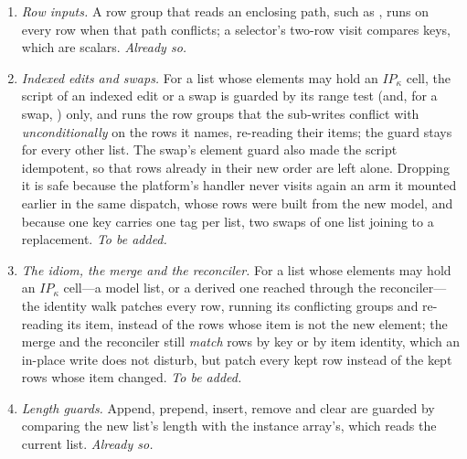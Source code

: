 \begin{enumerate}[label=(\alph*)]
skipping its body. A keyed 's key is of a key type, a scalar. \emph{Already so.}
\item \emph{Row inputs.} A row group that reads an enclosing path, such as , runs on
every row when that path conflicts; a selector's two-row visit compares keys, which are scalars.
\emph{Already so.}
\item \emph{Indexed edits and swaps.} For a list whose elements may hold an $\mathit{IP}_\kappa$ cell, the
script of an indexed edit or a swap is guarded by its range test (and, for a swap, )
only, and runs the row groups that the sub-writes conflict with \emph{unconditionally} on the rows it
names, re-reading their items; the guard  stays for every other list.
The swap's element guard also made the script idempotent, so that rows already in their new order are left
alone. Dropping it is safe because the platform's handler never visits again an arm it mounted earlier in
the same dispatch, whose rows were built from the new model, and because one key carries one tag per list,
two swaps of one list joining to a replacement. \emph{To be added.}
\item \emph{The  idiom, the merge and the reconciler.} For a list whose elements may hold an
$\mathit{IP}_\kappa$ cell---a model list, or a derived one reached through the reconciler---the identity walk
patches every row, running its conflicting groups and re-reading its item, instead of the rows whose item
is not \code{===} the new element; the merge and the reconciler still \emph{match} rows by key or by item
identity, which an in-place write does not disturb, but patch every kept row instead of the kept rows whose
item changed. \emph{To be added.}
\item \emph{Length guards.} Append, prepend, insert, remove and clear are guarded by comparing the new
list's length with the instance array's, which reads the current list. \emph{Already so.}
\end{enumerate}

